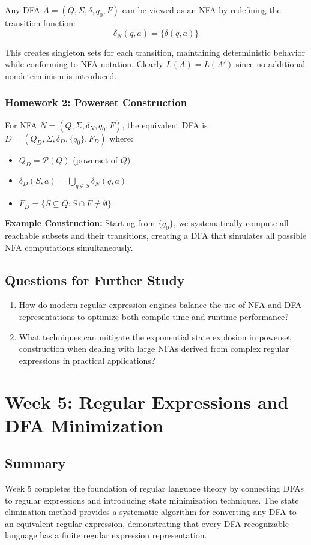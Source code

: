 \documentclass{article}
\begin{document}
Any DFA $A = (Q, \Sigma, \delta, q_0, F)$ can be viewed as an NFA by redefining the transition function:
$$\delta_N(q,a) = \{\delta(q,a)\}$$

This creates singleton sets for each transition, maintaining deterministic behavior while conforming to NFA notation. Clearly $L(A) = L(A')$ since no additional nondeterminism is introduced.

\subsubsection{Homework 2: Powerset Construction}

For NFA $N = (Q, \Sigma, \delta_N, q_0, F)$, the equivalent DFA is $D = (Q_D, \Sigma, \delta_D, \{q_0\}, F_D)$ where:

\begin{itemize}
    \item $Q_D = \mathcal{P}(Q)$ (powerset of $Q$)
    \item $\delta_D(S,a) = \bigcup_{q \in S} \delta_N(q,a)$
    \item $F_D = \{S \subseteq Q : S \cap F \neq \emptyset\}$
\end{itemize}

\textbf{Example Construction:}
Starting from $\{q_0\}$, we systematically compute all reachable subsets and their transitions, creating a DFA that simulates all possible NFA computations simultaneously.

\subsection{Questions for Further Study}
\begin{enumerate}
    \item How do modern regular expression engines balance the use of NFA and DFA representations to optimize both compile-time and runtime performance?
    
    \item What techniques can mitigate the exponential state explosion in powerset construction when dealing with large NFAs derived from complex regular expressions in practical applications?
\end{enumerate}

\section{Week 5: Regular Expressions and DFA Minimization}

\subsection{Summary}
Week 5 completes the foundation of regular language theory by connecting DFAs to regular expressions and introducing state minimization techniques. The state elimination method provides a systematic algorithm for converting any DFA to an equivalent regular expression, demonstrating that every DFA-recognizable language has a finite regular expression representation.
\end{document}
